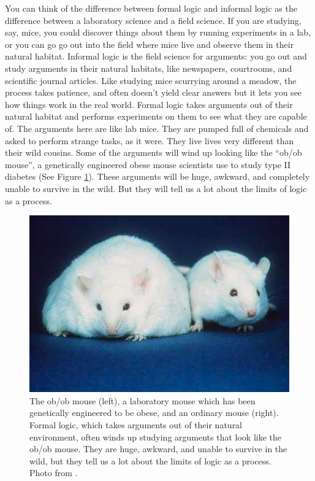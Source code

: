 You can think of the difference between formal logic and informal logic as the difference between a laboratory science and a field science. \label{lab_vs._field_science} If you are studying, say, mice, you could discover things about them by running experiments in a lab, or you can go go out into the field where mice live and observe them in their natural habitat.  Informal logic is the field science for arguments: you go out and study arguments in their natural habitats, like newspapers, courtrooms, and scientific journal articles. Like studying mice scurrying around a meadow, the process takes patience, and often doesn't yield clear answers but it lets you see how things work in the real world. Formal logic takes arguments out of their natural habitat and performs experiments on them to see what they are capable of. The arguments here are like lab mice. They are pumped full of chemicals and asked to perform strange tasks, as it were. They live lives very different than their wild cousins. Some of the arguments will wind up looking like the ``ob/ob mouse'', a genetically engineered obese mouse scientists use to study type II diabetes (See Figure \ref{fig:ob_ob_mouse}). These arguments will be huge, awkward, and completely unable to survive in the wild. But they will tell us a lot about the limits of logic as a process.

\begin{figure}
\begin{mdframed}[style=mytableclearbox]
\begin{center}
\includegraphics*{img/Fatmouse}
\end{center}
\end{mdframed}
\caption{The ob/ob mouse (left), a laboratory mouse which has been genetically engineered to be obese, and an ordinary mouse (right). Formal logic, which takes arguments out of their natural environment, often winds up studying arguments that look like the ob/ob mouse. They are huge, awkward, and unable to survive in the wild, but they tell us a lot about the limits of logic as a process. Photo from \cite{WikimediaCommons2006}.}
\label{fig:ob_ob_mouse}
\end{figure}


